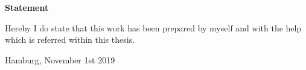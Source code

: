 \begin{center}
{\Huge \bf Statement}
\label{sec:statement}
\end{center}
Hereby I do state that this work has been prepared by myself and with the help which is referred within
this thesis.


\vspace{2cm}

Hamburg, November 1st 2019

